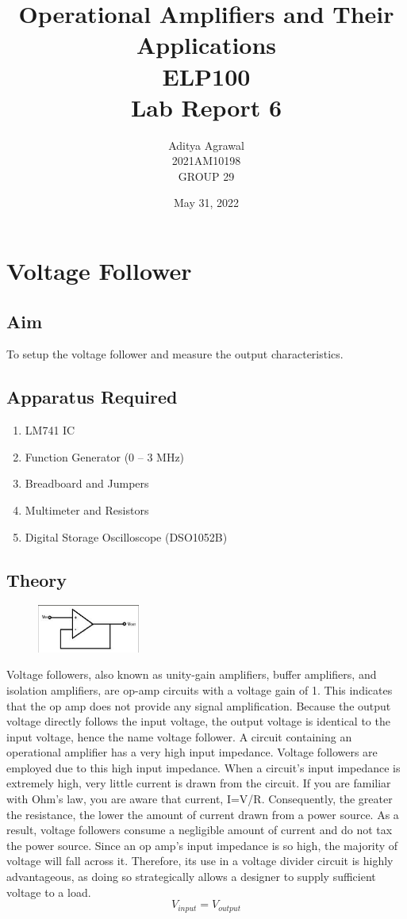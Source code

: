 \documentclass{article}
\title{Operational Amplifiers and Their Applications\\ ELP100\\Lab Report 6}
\author{Aditya Agrawal\\2021AM10198\\GROUP 29}
\date{May 31, 2022}
\begin{document}
\maketitle
\tableofcontents
\newpage

\section{Voltage Follower}
\subsection{Aim}
To setup the voltage follower and measure the output characteristics.

\subsection{Apparatus Required}
\begin{enumerate}
    \item LM741 IC
    \item Function Generator (0 – 3 MHz)
    \item Breadboard and Jumpers
    \item Multimeter and Resistors
    \item Digital Storage Oscilloscope (DSO1052B)
\end{enumerate}
\subsection{Theory}
\begin{figure}
\includegraphics[width=0.3\textwidth]{i1.png}
\end{figure}
Voltage followers, also known as unity-gain amplifiers, buffer amplifiers, and isolation amplifiers, are op-amp circuits with a voltage gain of 1. This indicates that the op amp does not provide any signal amplification. Because the output voltage directly follows the input voltage, the output voltage is identical to the input voltage, hence the name voltage follower. A circuit containing an operational amplifier has a very high input impedance. Voltage followers are employed due to this high input impedance. When a circuit's input impedance is extremely high, very little current is drawn from the circuit. If you are familiar with Ohm's law, you are aware that current, I=V/R. Consequently, the greater the resistance, the lower the amount of current drawn from a power source. As a result, voltage followers consume a negligible amount of current and do not tax the power source. Since an op amp's input impedance is so high, the majority of voltage will fall across it. Therefore, its use in a voltage divider circuit is highly advantageous, as doing so strategically allows a designer to supply sufficient voltage to a load.
\begin{equation}
    V_{input}=V_{output}
\end{equation}
\newpage
\end{document}

